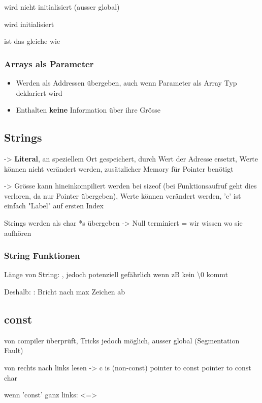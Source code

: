 \begin{multicols*}{4}
 wird nicht initialisiert (ausser global)

 wird initialisiert

 ist das gleiche wie 

\subsubsection{Arrays als Parameter}
\begin{itemize}
    \item Werden als Addressen übergeben, auch wenn Parameter als Array Typ deklariert wird
    \item Enthalten \textbf{keine} Information über ihre Grösse
\end{itemize}

\subsection{Strings}
 -> \textbf{Literal}, an speziellem Ort gespeichert, durch Wert der Adresse ersetzt, Werte können nicht verändert werden, zusätzlicher Memory für Pointer benötigt

 -> Grösse kann hineinkompiliert werden bei sizeof (bei Funktionsaufruf geht dies verloren, da nur Pointer übergeben), Werte können verändert werden, 'c' ist einfach "Label" auf ersten Index

Strings werden als char *s übergeben -> Null terminiert = wir wissen wo sie aufhören

\subsubsection{String Funktionen}
Länge von String: , jedoch potenziell gefährlich wenn zB kein \textbackslash0 kommt

Deshalb: : Bricht nach max Zeichen ab


\subsection{const}
von compiler überprüft, Tricks jedoch möglich, ausser global (Segmentation Fault)\vspace{2pt}

von rechts nach links lesen
 -> c is (non-const) pointer to const pointer to const char

wenn 'const' ganz links:  <=> 



\end{multicols*}
